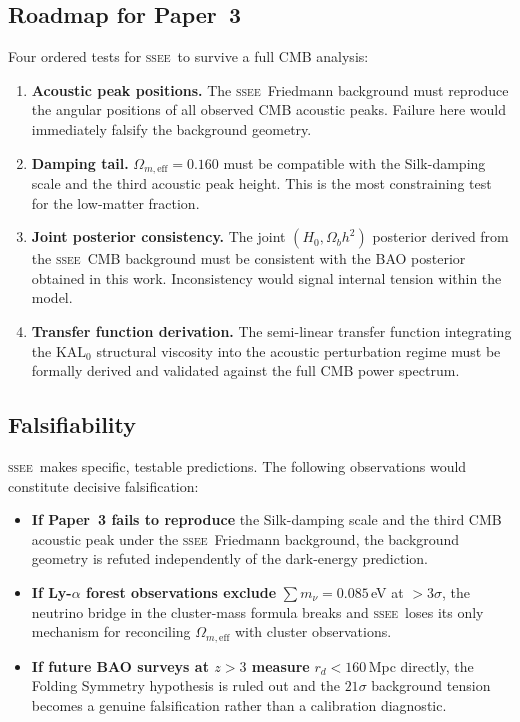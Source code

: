 \documentclass[12pt,a4paper]{article}
\newcommand{\SSEE}{\ifmmode\mathrm{SSEE}\else\textsc{ssee}\fi}
\newcommand{\KALz}{\mathrm{KAL}_0}
\begin{document}
\subsection{Roadmap for Paper~3}

Four ordered tests for \SSEE\ to survive a full CMB analysis:
\begin{enumerate}
  \item \textbf{Acoustic peak positions.} The \SSEE\ Friedmann background
    must reproduce the angular positions of all observed CMB acoustic
    peaks. Failure here would immediately falsify the background geometry.
  \item \textbf{Damping tail.} $\Omega_{m,\mathrm{eff}}=0.160$ must be
    compatible with the Silk-damping scale and the third acoustic peak
    height. This is the most constraining test for the low-matter fraction.
  \item \textbf{Joint posterior consistency.} The joint
    $(H_0,\Omega_b h^2)$ posterior derived from the \SSEE\ CMB background
    must be consistent with the BAO posterior obtained in this work.
    Inconsistency would signal internal tension within the model.
  \item \textbf{Transfer function derivation.} The semi-linear transfer
    function integrating the $\KALz$ structural viscosity into the
    acoustic perturbation regime must be formally derived and validated
    against the full CMB power spectrum.
\end{enumerate}

\subsection{Falsifiability}

\SSEE\ makes specific, testable predictions. The following observations
would constitute decisive falsification:
\begin{itemize}
  \item \textbf{If Paper~3 fails to reproduce} the Silk-damping scale
    and the third CMB acoustic peak under the \SSEE\ Friedmann
    background, the background geometry is refuted independently of
    the dark-energy prediction.
  \item \textbf{If Ly-$\alpha$ forest observations exclude}
    $\sum m_\nu=0.085$\,eV at $>3\sigma$, the neutrino bridge in the
    cluster-mass formula breaks and \SSEE\ loses its only mechanism
    for reconciling $\Omega_{m,\mathrm{eff}}$ with cluster observations.
  \item \textbf{If future BAO surveys at $z>3$ measure}
    $r_d<160$\,Mpc directly, the Folding Symmetry hypothesis is
    ruled out and the $21\sigma$ background tension becomes a
    genuine falsification rather than a calibration diagnostic.
\end{itemize}
\end{document}

